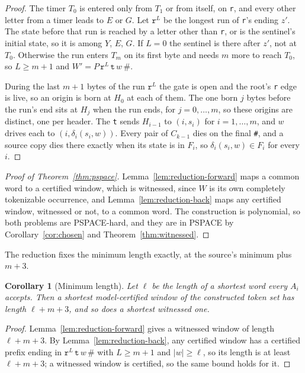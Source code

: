 \documentclass[11pt,a4paper]{article}
\theoremstyle{definition}
\theoremstyle{plain}
\newtheorem{corollary}{Corollary}
\newcommand{\code}[1]{\texttt{#1}}
\begin{document}
\begin{proof}
The timer $T_0$ is entered only from $T_1$ or from itself, on \code{r}, and every other letter from a timer leads to $E$
or $G$. Let $\code{r}^L$ be the longest run of \code{r}'s ending $z'$. The state before that run is reached by a letter
other than \code{r}, or is the sentinel's initial state, so it is among $Y$, $E$, $G$. If $L = 0$ the sentinel is there
after $z'$, not at $T_0$. Otherwise the run enters $T_m$ on its first byte and needs $m$ more to reach $T_0$, so
$L \geq m + 1$ and $W' = P\, \code{r}^{L}\, \code{t}\, w\, \code{\#}$.

During the last $m + 1$ bytes of the run $\code{r}^L$ the gate is open and the root's \code{r} edge is live, so an
origin is born at $H_0$ at each of them. The one born $j$ bytes before the run's end sits at $H_j$ when the run ends,
for $j = 0, \ldots, m$, so these origins are distinct, one per header. The \code{t} sends $H_{i-1}$ to $(i, s_i)$ for
$i = 1, \ldots, m$, and $w$ drives each to $(i, \delta_i(s_i, w))$. Every pair of $C_{k-1}$ dies on the final \code{\#},
and a source copy dies there exactly when its state is in $F_i$, so $\delta_i(s_i, w) \in F_i$ for every $i$.
\end{proof}

\begin{proof}[Proof of Theorem~\ref{thm:pspace}]
Lemma~\ref{lem:reduction-forward} maps a common word to a certified window, which is witnessed, since $W$ is its own
completely tokenizable occurrence, and Lemma~\ref{lem:reduction-back} maps any certified window, witnessed or not, to a
common word. The construction is polynomial, so both problems are PSPACE-hard, and they are in PSPACE by
Corollary~\ref{cor:chosen} and Theorem~\ref{thm:witnessed}.
\end{proof}

The reduction fixes the minimum length exactly, at the source's minimum plus $m + 3$.

\begin{corollary}[Minimum length]
\label{cor:reduction-length}
Let $\ell$ be the length of a shortest word every $A_i$ accepts. Then a shortest model-certified window of the
constructed token set has length $\ell + m + 3$, and so does a shortest witnessed one.
\end{corollary}

\begin{proof}
Lemma~\ref{lem:reduction-forward} gives a witnessed window of length $\ell + m + 3$. By Lemma~\ref{lem:reduction-back},
any certified window has a certified prefix ending in $\code{r}^{L}\, \code{t}\, w\, \code{\#}$ with $L \geq m + 1$ and
$|w| \geq \ell$, so its length is at least $\ell + m + 3$; a witnessed window is certified, so the same bound holds for
it.
\end{proof}
\end{document}
